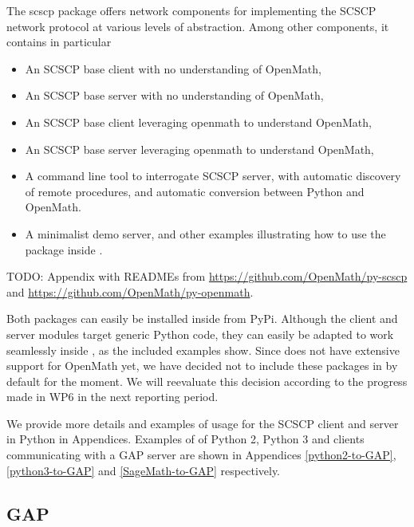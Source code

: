 \documentclass{deliverablereport}
\begin{document}
The {\sf scscp} package offers network components for implementing the
SCSCP network protocol at various levels of abstraction. Among other
components, it contains in particular
\begin{itemize}
\item An SCSCP base client with no understanding of OpenMath,
\item An SCSCP base server with no understanding of OpenMath,
\item An SCSCP base client leveraging {\sf openmath} to understand OpenMath,
\item An SCSCP base server leveraging {\sf openmath} to understand OpenMath,
\item A command line tool to interrogate SCSCP server, with automatic
  discovery of remote procedures, and automatic conversion between
  Python and OpenMath.
\item A minimalist demo server, and other examples illustrating how to
  use the package inside \Sage.
\end{itemize}

TODO: Appendix with READMEs from \url{https://github.com/OpenMath/py-scscp}
and \url{https://github.com/OpenMath/py-openmath}.

Both packages can easily be installed inside \Sage from PyPi. Although
the client and server modules target generic Python code, they can
easily be adapted to work seamlessly inside \Sage, as the included
examples show. Since \Sage does not have extensive support for
OpenMath yet, we have decided not to include these packages in \Sage
by default for the moment. We will reevaluate this decision according
to the progress made in WP6 in the next reporting period.

We provide more details and examples of usage for the SCSCP client and server in
Python in Appendices. Examples of of Python 2, Python 3 and \Sage clients 
communicating with a GAP server are shown in Appendices \ref{python2-to-GAP},
\ref{python3-to-GAP} and \ref{SageMath-to-GAP} respectively.



\subsection{GAP}
\end{document}
